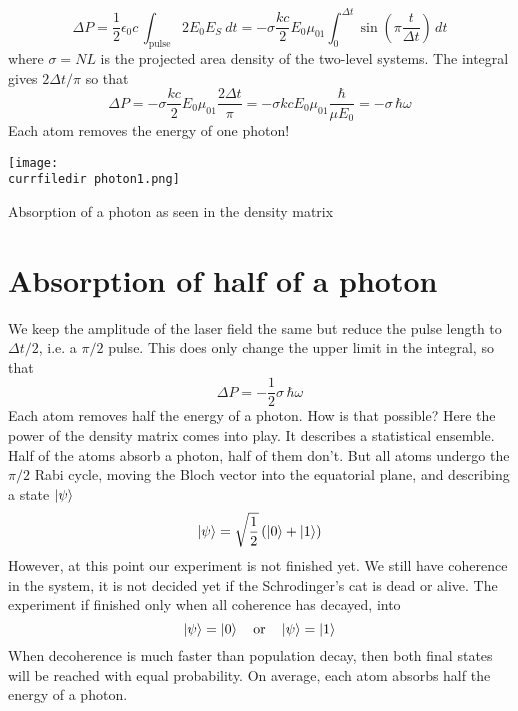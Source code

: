 \begin{equation}
 \Delta P = \frac{1}{2} \epsilon_0 c \,  
\int_\text{pulse} 2 E_0 E_S  \ dt
  =-   \sigma \frac{k c }{2}  E_0 \mu_{01}  \int_0^{\Delta t}   \sin \left( \pi \frac{t}{\Delta t} \right)  \,  dt
\end{equation}
where $\sigma = N L $ is the projected area density of the two-level systems. The integral gives $2 \Delta t/\pi$ so that
\begin{equation}
 \Delta P =-  \sigma \frac{k c}{2}  E_0 \mu_{01} \frac{2 \Delta t}{\pi}
= -  \sigma k c   E_0 \mu_{01}  \frac{\hbar}{\mu E_0} 
= -  \sigma \,  \hbar \omega  
\end{equation}
Each atom removes the energy of one photon!

\begin{marginfigure}
\texttt{[image: \\currfiledir photon1.png]}
\caption{Absorption of a photon as seen in the density matrix}
\end{marginfigure}


\section{Absorption of half of a photon}

We keep the amplitude of the laser field the same but reduce the pulse length to $\Delta t / 2$, i.e. a $\pi/2$ pulse. This does only change the upper limit in the integral, so that 
\begin{equation}
 \Delta P 
= -  \frac{1}{2} \sigma \,  \hbar \omega  
\end{equation}
Each atom removes half the energy  of a photon. How is that possible?  Here the power of the density matrix comes into play. It describes a statistical ensemble. Half of the atoms absorb a photon, half of them don't. But all atoms undergo the $\pi/2$ Rabi cycle, moving the Bloch vector into the equatorial plane, and describing a state $\ket{\psi}$
\begin{equation}
 \ket{\psi} = \sqrt{\frac{1}{2}} \left( \ket{0} + \ket{1} \right)
\end{equation}
However, at this point our experiment is not finished yet. We still have coherence in the system, it is not decided yet if the Schrodinger's cat is dead or alive. The experiment if finished only when all coherence has decayed, into
\begin{equation}
 \ket{\psi} = \ket{0}  \quad \text{or} \quad \ket{\psi} = \ket{1} 
\end{equation}
When decoherence is much faster than population decay, then both final states will be reached with equal probability. On average, each atom absorbs half the energy of a photon.

